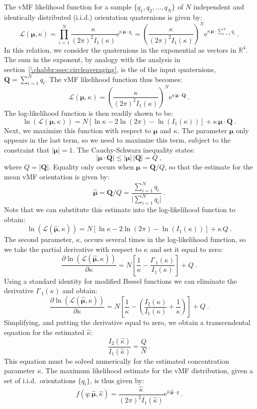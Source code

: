 The vMF likelihood function for a sample $\{q_1,q_2,\ldots,q_N\}$ of $N$ independent and identically distributed (i.i.d.) orientation quaternions is given by:
\[
	\mathcal{L}(\bm{\mu},\kappa) = \prod_{i=1}^N \frac{\kappa}{(2\pi)^2I_1(\kappa)}\mathrm{e}^{\kappa\,\bm{\mu}\cdot q_i} = \left( \frac{\kappa}{(2\pi)^2I_1(\kappa)}\right)^N
	\mathrm{e}^{\kappa\,\bm{\mu}\cdot \sum_{i=1}^N q_i} \ .
\]
In this relation, we consider the quaternions in the exponential as vectors in $\mathbb{R}^4$.  The sum in the exponent, by analogy with the analysis in section~\ref{\chabbr:ssec:circleaveraging}, is the  of the input quaternions, $\mathbf{Q}=\sum_{i=1}^N q_i$. The vMF likelihood function thus becomes:
\[
	\mathcal{L}(\bm{\mu},\kappa) = \left(\frac{\kappa}{(2\pi)^2I_1(\kappa)}\right)^N \mathrm{e}^{\kappa\,\bm{\mu}\cdot\mathbf{Q}} \ .
\]
The log-likelihood function is then readily shown to be:
\[
	\ln\left(\mathcal{L}(\bm{\mu},\kappa)\right) = N[\ln\kappa -2\ln(2\pi)- \ln(I_1(\kappa))] + \kappa\, \bm{\mu}\cdot \mathbf{Q}\ .
\]
Next, we maximize this function with respect to $\bm{\mu}$ and $\kappa$. The parameter $\bm{\mu}$ only appears in the last term, so we need to maximize this term, subject to the constraint that $\vert \bm{\mu}\vert=1$.  The Cauchy-Schwarz inequality states:
\[
	\vert \bm{\mu}\cdot \mathbf{Q}\vert \le \vert\bm{\mu}\vert\,\vert\mathbf{Q}\vert = Q\ ,
\]
where $Q=\vert\mathbf{Q}\vert$. Equality only occurs when $\bm{\mu}= \mathbf{Q}/Q$, so that the estimate for the mean vMF orientation is given by:
\[
 	\hat{\bm{\mu}} = \mathbf{Q}/Q = \frac{\sum_{i=1}^N q_i}{\vert \sum_{i=1}^N q_i\vert}\ .
\]
Note that we can substitute this estimate into the log-likelihood function to obtain:
\[
	\ln\left(\mathcal{L}(\hat{\bm{\mu}},\kappa)\right) = N[\ln\kappa -2\ln(2\pi)- \ln(I_1(\kappa))] + \kappa\, Q\ .
\]
The second parameter, $\kappa$, occurs several times in the log-likelihood function, so we take the partial derivative with respect to $\kappa$ and set it equal to zero:
\[
	\frac{\partial\ln\left(\mathcal{L}(\hat{\bm{\mu}},\kappa)\right)}{\partial\kappa} = N\left[\frac{1}{\kappa}-\frac{I'_1(\kappa)}{I_1(\kappa)}\right]+Q\ .
\]
Using a standard identity for modified Bessel functions we can eliminate the derivative $I'_1(\kappa)$ and obtain:
\[
	\frac{\partial\ln\left(\mathcal{L}(\hat{\bm{\mu}},\kappa)\right)}{\partial\kappa} = N\left[\frac{1}{\kappa}-\left(\frac{I_2(\kappa)}{I_1(\kappa)}+\frac{1}{\kappa}\right)\right]+Q\ .
\]
Simplifying, and putting the derivative equal to zero, we obtain a transcendental equation for the estimated $\hat{\kappa}$:
\[
	\frac{I_2(\hat{\kappa})}{I_1(\hat{\kappa})} = \frac{Q}{N}\ .
\]
This equation must be solved numerically for the estimated concentration parameter $\hat{\kappa}$. The maximum likelihood estimate for the vMF distribution, given a set of i.i.d.\ orientations $\{q_i\}$, is thus given by:
\[
	f(q;\hat{\bm{\mu}},\hat{\kappa}) = \frac{\hat{\kappa}}{(2\pi)^2I_1(\hat{\kappa})}\mathrm{e}^{\hat{\kappa}\,\hat{\bm{\mu}}\cdot q}\ .
\]

